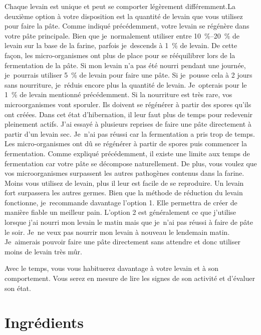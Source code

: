 Chaque levain est unique et peut se comporter légèrement différemment.La deuxième option à votre disposition est la quantité de levain que vous utilisez pour faire la pâte. Comme indiqué précédemment, votre levain se régénère dans votre pâte principale. Bien que je~normalement utiliser entre \qtyrange{10}{20}{\percent} de levain sur la base de la farine, parfois je~descends à \qty{1}{\percent} de levain. De cette façon, les micro-organismes ont plus de place pour se rééquilibrer lors de la fermentation de la pâte. Si mon levain n'a pas été nourri pendant une journée, je~pourrais utiliser \qty{5}{\percent} de levain pour faire une pâte. Si je~pousse cela à 2 jours sans nourriture, je~réduis encore plus la quantité de levain. Je~opterais pour le \qty{1}{\percent} de levain mentionné précédemment. Si la nourriture est très rare, vos microorganismes vont sporuler. Ils doivent se régénérer à partir des spores qu'ils ont créées. Dans cet état d'hibernation, il leur faut plus de temps pour redevenir pleinement actifs. J'ai essayé à plusieurs reprises de faire une pâte directement à partir d'un levain sec. Je~n'ai pas réussi car la fermentation a pris trop de temps. Les micro-organismes ont dû se régénérer à partir de spores puis commencer la fermentation. Comme expliqué précédemment, il existe une limite aux temps de fermentation car votre pâte se décompose naturellement. De plus, vous voulez que vos microorganismes surpassent les autres pathogènes contenus dans la farine. Moins vous utilisez de levain, plus il leur est facile de se reproduire. Un levain fort surpassera les autres germes. Bien que la méthode de réduction du levain fonctionne, je~recommande davantage l'option 1. Elle permettra de créer de manière fiable un meilleur pain. L'option 2 est généralement ce que j'utilise lorsque j'ai nourri mon levain le matin mais que je~n'ai pas réussi à faire de pâte le soir. Je~ne veux pas nourrir mon levain à nouveau le lendemain matin. Je~aimerais pouvoir faire une pâte directement sans attendre et donc utiliser moins de levain très mûr.

Avec le temps, vous vous habituerez davantage à votre levain et à son comportement. Vous serez en mesure de lire les signes de son activité et d'évaluer son état.

\section{Ingrédients}

